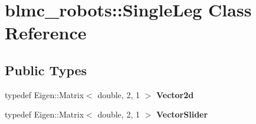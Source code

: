 \hypertarget{classblmc__robots_1_1SingleLeg}{}\section{blmc\+\_\+robots\+:\+:Single\+Leg Class Reference}
\label{classblmc__robots_1_1SingleLeg}
\subsection*{Public Types}
\begin{DoxyCompactItemize}
\item 
\mbox{\label{classblmc__robots_1_1SingleLeg_a37fdbf57313957a5773cb13f2ad7190c}} 
typedef Eigen\+::\+Matrix$<$ double, 2, 1 $>$ {\bfseries Vector2d}
\item 
\mbox{\label{classblmc__robots_1_1SingleLeg_a926cd2dfc01483687d44259874450757}} 
typedef Eigen\+::\+Matrix$<$ double, 2, 1 $>$ {\bfseries Vector\+Slider}
\end{DoxyCompactItemize}
